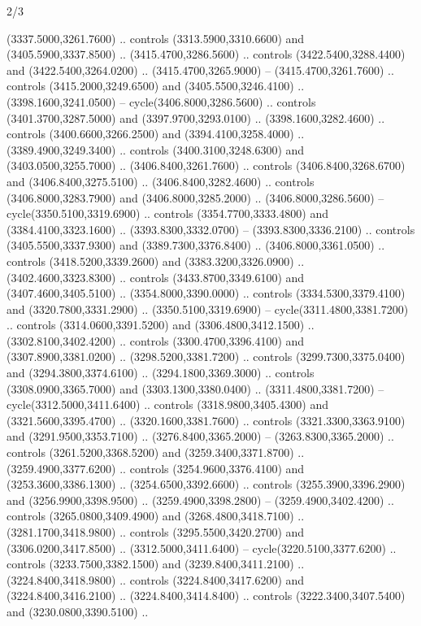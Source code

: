 \begin{flagdescription}{2/3}
\begin{scope}[shift={(0.5\flaglength,0.5)},scale=\flagwidth/130]
\begin{scope}[y=0.01mm, x=0.01mm,shift={(-3365,-2250)}]
  (3337.5000,3261.7600) .. controls (3313.5900,3310.6600) and
  (3405.5900,3337.8500) .. (3415.4700,3286.5600) .. controls
  (3422.5400,3288.4400) and (3422.5400,3264.0200) .. (3415.4700,3265.9000) --
  (3415.4700,3261.7600) .. controls (3415.2000,3249.6500) and
  (3405.5500,3246.4100) .. (3398.1600,3241.0500) -- cycle(3406.8000,3286.5600)
  .. controls (3401.3700,3287.5000) and (3397.9700,3293.0100) ..
  (3398.1600,3282.4600) .. controls (3400.6600,3266.2500) and
  (3394.4100,3258.4000) .. (3389.4900,3249.3400) .. controls
  (3400.3100,3248.6300) and (3403.0500,3255.7000) .. (3406.8400,3261.7600) ..
  controls (3406.8400,3268.6700) and (3406.8400,3275.5100) ..
  (3406.8400,3282.4600) .. controls (3406.8000,3283.7900) and
  (3406.8000,3285.2000) .. (3406.8000,3286.5600) -- cycle(3350.5100,3319.6900)
  .. controls (3354.7700,3333.4800) and (3384.4100,3323.1600) ..
  (3393.8300,3332.0700) -- (3393.8300,3336.2100) .. controls
  (3405.5500,3337.9300) and (3389.7300,3376.8400) .. (3406.8000,3361.0500) ..
  controls (3418.5200,3339.2600) and (3383.3200,3326.0900) ..
  (3402.4600,3323.8300) .. controls (3433.8700,3349.6100) and
  (3407.4600,3405.5100) .. (3354.8000,3390.0000) .. controls
  (3334.5300,3379.4100) and (3320.7800,3331.2900) .. (3350.5100,3319.6900) --
  cycle(3311.4800,3381.7200) .. controls (3314.0600,3391.5200) and
  (3306.4800,3412.1500) .. (3302.8100,3402.4200) .. controls
  (3300.4700,3396.4100) and (3307.8900,3381.0200) .. (3298.5200,3381.7200) ..
  controls (3299.7300,3375.0400) and (3294.3800,3374.6100) ..
  (3294.1800,3369.3000) .. controls (3308.0900,3365.7000) and
  (3303.1300,3380.0400) .. (3311.4800,3381.7200) -- cycle(3312.5000,3411.6400)
  .. controls (3318.9800,3405.4300) and (3321.5600,3395.4700) ..
  (3320.1600,3381.7600) .. controls (3321.3300,3363.9100) and
  (3291.9500,3353.7100) .. (3276.8400,3365.2000) -- (3263.8300,3365.2000) ..
  controls (3261.5200,3368.5200) and (3259.3400,3371.8700) ..
  (3259.4900,3377.6200) .. controls (3254.9600,3376.4100) and
  (3253.3600,3386.1300) .. (3254.6500,3392.6600) .. controls
  (3255.3900,3396.2900) and (3256.9900,3398.9500) .. (3259.4900,3398.2800) --
  (3259.4900,3402.4200) .. controls (3265.0800,3409.4900) and
  (3268.4800,3418.7100) .. (3281.1700,3418.9800) .. controls
  (3295.5500,3420.2700) and (3306.0200,3417.8500) .. (3312.5000,3411.6400) --
  cycle(3220.5100,3377.6200) .. controls (3233.7500,3382.1500) and
  (3239.8400,3411.2100) .. (3224.8400,3418.9800) .. controls
  (3224.8400,3417.6200) and (3224.8400,3416.2100) .. (3224.8400,3414.8400) ..
  controls (3222.3400,3407.5400) and (3230.0800,3390.5100) ..

\end{scope}
\end{scope}
\end{flagdescription}
